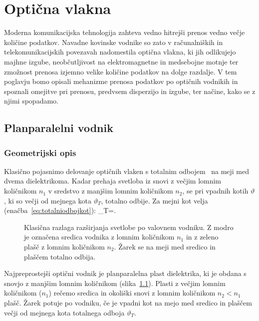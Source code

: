 
\chapter{Optična vlakna}
\label{chap:fibri}
Moderna komunikacijska tehnologija zahteva vedno hitrejši prenos
vedno večje količine podatkov. Navadne kovinske vodnike
so zato v računalniških in telekomunikacijskih povezavah nadomestila optična 
vlakna, ki jih odlikujejo majhne izgube, neobčutljivost na elektromagnetne
in medsebojne motnje ter zmožnost prenosa izjemno velike količine podatkov
na dolge razdalje. V tem poglavju bomo opisali mehanizme prenosa podatkov 
po optičnih vodnikih in spoznali omejitve pri prenosu,
predvsem disperzijo in izgube, ter načine, kako se z njimi spopadamo.

\section{Planparalelni vodnik}
\subsection*{Geometrijski opis}
Klasično pojasnimo delovanje optičnih vlaken s totalnim odbojem~
na meji med dvema dielektrikoma. Kadar prehaja svetloba iz snovi 
z večjim lomnim količnikom $n_1$ v sredstvo z manjšim lomnim količnikom $n_2$, se pri vpadnih kotih $\vartheta$, ki so večji od mejnega 
kota $\vartheta_T$, totalno odbije. Za mejni kot velja 
(enačba~\ref{eq:totalniodbojkot}):
\beq
\sin\vartheta_{T}=.
\label{10totalni}
\eeq
\begin{figure}[ht]
\centering
\def\svgwidth{110truemm} 

\caption{Klasična razlaga razširjanja svetlobe po valovnem vodniku. Z modro je označena sredica
vodnika z lomnim količnikom $n_1$ in z zeleno plašč z lomnim količnikom $n_2$. 
Žarek se na meji med sredico in plaščem totalno odbija.}
\label{fig:vodnik}
\end{figure}

Najpreprostejši optični vodnik je planparalelna plast 
dielektrika, ki je obdana s snovjo z manjšim lomnim količnikom (slika~\ref{fig:vodnik}). 
Plasti z večjim lomnim količnikom ($n_1$) rečemo sredica in 
okoliški snovi z lomnim količnikom $n_2<n_1$ plašč. 
Žarek potuje po vodniku, če je vpadni kot 
na mejo med sredico in plaščem večji od mejnega kota totalnega odboja $\vartheta_T$.

